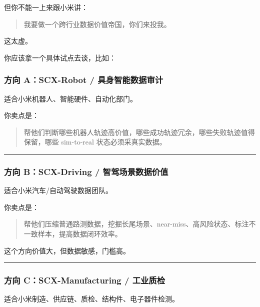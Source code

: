 \documentclass[
  12pt,
]{ctexart}
\begin{document}
但你不能一上来跟小米讲：

\begin{quote}
我要做一个跨行业数据价值帝国，你们来投我。
\end{quote}

这太虚。

你应该拿一个具体试点去谈，比如：

\subsubsection{方向 A：SCX-Robot /
具身智能数据审计}\label{ux65b9ux5411-ascx-robot-ux5177ux8eabux667aux80fdux6570ux636eux5ba1ux8ba1}

适合小米机器人、智能硬件、自动化部门。

你卖点是：

\begin{quote}
帮他们判断哪些机器人轨迹高价值，哪些成功轨迹冗余，哪些失败轨迹值得保留，哪些
sim-to-real 状态必须采真实数据。
\end{quote}

\begin{center}\rule{0.5\linewidth}{0.5pt}\end{center}

\subsubsection{方向 B：SCX-Driving /
智驾场景数据价值}\label{ux65b9ux5411-bscx-driving-ux667aux9a7eux573aux666fux6570ux636eux4ef7ux503c}

适合小米汽车/自动驾驶数据团队。

你卖点是：

\begin{quote}
帮他们压缩普通路测数据，挖掘长尾场景、near-miss、高风险状态、标注不一致样本，提高数据闭环效率。
\end{quote}

这个方向价值大，但数据敏感，门槛高。

\begin{center}\rule{0.5\linewidth}{0.5pt}\end{center}

\subsubsection{方向 C：SCX-Manufacturing /
工业质检}\label{ux65b9ux5411-cscx-manufacturing-ux5de5ux4e1aux8d28ux68c0}

适合小米制造、供应链、质检、结构件、电子器件检测。
\end{document}
